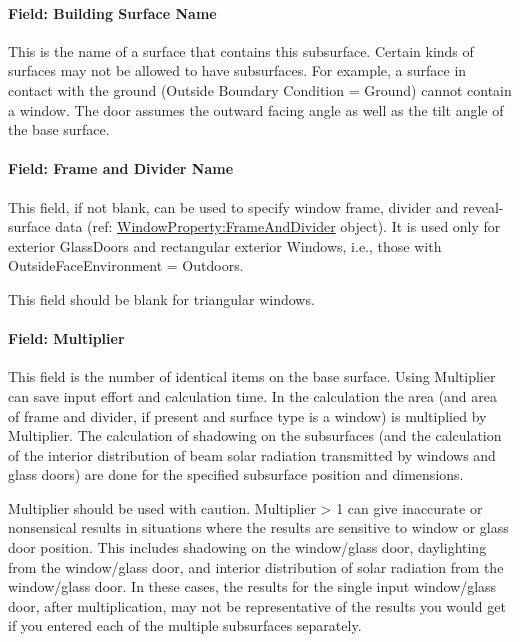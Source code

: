 \paragraph{Field: Building Surface Name}\label{field-building-surface-name-2}

This is the name of a surface that contains this subsurface. Certain kinds of surfaces may not be allowed to have subsurfaces. For example, a surface in contact with the ground (Outside Boundary Condition = Ground) cannot contain a window. The door assumes the outward facing angle as well as the tilt angle of the base surface.

\paragraph{Field: Frame and Divider Name}\label{field-frame-and-divider-name-1}

This field, if not blank, can be used to specify window frame, divider and reveal-surface data (ref: \hyperref[windowpropertyframeanddivider]{WindowProperty:FrameAndDivider} object). It is used only for exterior GlassDoors and rectangular exterior Windows, i.e., those with OutsideFaceEnvironment = Outdoors.

This field should be blank for triangular windows.

\paragraph{Field: Multiplier}\label{field-multiplier-3}

This field is the number of identical items on the base surface. Using Multiplier can save input effort and calculation time. In the calculation the area (and area of frame and divider, if present and surface type is a window) is multiplied by Multiplier. The calculation of shadowing on the subsurfaces (and the calculation of the interior distribution of beam solar radiation transmitted by windows and glass doors) are done for the specified subsurface position and dimensions.

Multiplier should be used with caution. Multiplier \textgreater{} 1 can give inaccurate or nonsensical results in situations where the results are sensitive to window or glass door position. This includes shadowing on the window/glass door, daylighting from the window/glass door, and interior distribution of solar radiation from the window/glass door. In these cases, the results for the single input window/glass door, after multiplication, may not be representative of the results you would get if you entered each of the multiple subsurfaces separately.

